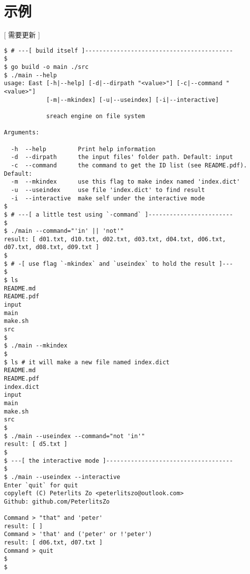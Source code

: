 \section{示例}

[ 需要更新 ]

\begin{lstlisting}
$ # ---[ build itself ]------------------------------------------
$
$ go build -o main ./src
$ ./main --help
usage: East [-h|--help] [-d|--dirpath "<value>"] [-c|--command "<value>"]
            [-m|--mkindex] [-u|--useindex] [-i|--interactive]

            sreach engine on file system

Arguments:

  -h  --help         Print help information
  -d  --dirpath      the input files' folder path. Default: input
  -c  --command      the command to get the ID list (see README.pdf). Default: 
  -m  --mkindex      use this flag to make index named 'index.dict'
  -u  --useindex     use file 'index.dict' to find result
  -i  --interactive  make self under the interactive mode
$
$ # ---[ a little test using `-command` ]------------------------
$
$ ./main --command="'in' || 'not'"
result: [ d01.txt, d10.txt, d02.txt, d03.txt, d04.txt, d06.txt, d07.txt, d08.txt, d09.txt ]
$
$ # -[ use flag `-mkindex` and `useindex` to hold the result ]---
$
$ ls
README.md
README.pdf
input
main
make.sh
src
$
$ ./main --mkindex
$
$ ls # it will make a new file named index.dict
README.md
README.pdf
index.dict
input
main
make.sh
src
$
$ ./main --useindex --command="not 'in'"
result: [ d5.txt ]
$
$ ---[ the interactive mode ]------------------------------------
$
$ ./main --useindex --interactive
Enter `quit` for quit
copyleft (C) Peterlits Zo <peterlitszo@outlook.com>
Github: github.com/PeterlitsZo

Command > "that" and 'peter'
result: [ ]
Command > 'that' and ('peter' or !'peter')
result: [ d06.txt, d07.txt ]
Command > quit
$ 
$ 
\end{lstlisting}

